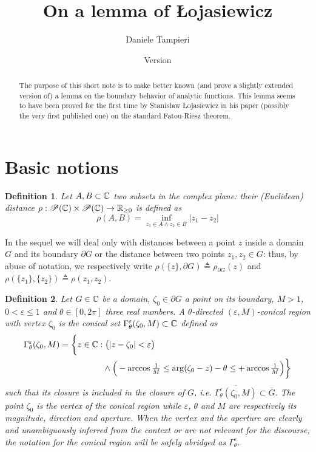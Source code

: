 \documentclass[a4paper,10pt]{article}
\title{On a lemma of Łojasiewicz}
\author{Daniele Tampieri}
\date{Version \vhCurrentVersion}
\newtheorem{defn}{Definition}
\begin{document}
\maketitle
{}
\begin{abstract}
  The purpose of this short note is to make better known (and prove a slightly extended version of) a lemma on the boundary behavior of analytic functions. This lemma seems to have been proved for the first time by Stanisław Łojasiewicz in his paper (possibly the very first published one) \cite{Lojasiewicz1950} on the standard Fatou-Riesz theorem.
\end{abstract}
\section{Basic notions}
\begin{defn} Let $A,B\subset \Bbb C$ two subsets in the complex plane: their \emph{(Euclidean) distance} $\rho:\mathscr{P}(\Bbb C)\times\mathscr{P}(\Bbb C)\to\Bbb R_{\ge0}$ is defined as
  \begin{equation*}\label{eq:dist}
    \rho(A,B)=\inf_{z_1\in A \wedge z_2\in B}|z_1-z_2|
  \end{equation*}
\end{defn}
In the sequel we will deal only with distances between a point $z$ inside a domain $G$ and its boundary $\partial G$ or the distance between two points $z_1, z_2\in G$: thus, by abuse of notation, we respectively write $\rho(\{z\},\partial G)\triangleq \rho_{\partial G}(z)$ and $\rho(\{z_1\},\{z_2\})\triangleq \rho(z_1,z_2)$.
\begin{defn}\label{def:appreg} Let $G\in\Bbb C$ be a domain, $\zeta_0 \in\partial G$ a point on its boundary, $M>1$, $0< \varepsilon \le 1$ and $\theta\in[0,2\pi]$ three real numbers. A $\theta$-\emph{directed $(\varepsilon,M)$-conical  region with vertex $\zeta_0$} is the conical set $\Gamma_{\theta}^{\varepsilon}(\zeta_0,M)\subset\Bbb C$ defined as
  \begin{equation}
    \begin{split}
      \Gamma_{\theta}^{\varepsilon}(\zeta_0,M)=\bigg\{ z\in \Bbb C  : &\; \big(|z -\zeta_0|<\varepsilon\big) \\
      & \land\Big(-\arccos\tfrac{1}{M}\le\arg (\zeta_0- z) -\theta \le + \arccos\tfrac{1}{M}\Big)\bigg\}
    \end{split}
  \end{equation}
  such that its closure is included in the closure of $G$, i.e. $\overline{\Gamma_{\theta}^{\varepsilon}(\zeta_0,M)}\subset\overline{G}$. The point $\zeta_0$ is the \emph{vertex} of the conical region while $\varepsilon$, $\theta$ and $M$ are respectively its \emph{magnitude}, \emph{direction} and \emph{aperture}. When the vertex and the aperture are clearly and unambiguously inferred from the context or are not relevant for the discourse, the notation for the conical region will be safely abridged as $\Gamma_{\theta}^{\varepsilon}$.
\end{defn}
\end{document}
